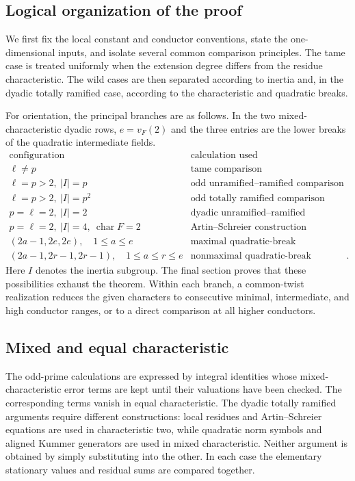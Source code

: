 \documentclass[11pt]{amsart}
\theoremstyle{definition}
\theoremstyle{remark}
\begin{document}
\subsection*{Logical organization of the proof}
We first fix the local constant and conductor conventions, state the
one-dimensional inputs, and isolate several common comparison
principles. The tame case is treated uniformly when the extension
degree differs from the residue characteristic. The wild cases are
then separated according to inertia and, in the dyadic totally ramified
case, according to the characteristic and quadratic breaks.

For orientation, the principal branches are as follows. In the two
mixed-characteristic dyadic rows, $e=v_F(2)$ and the three entries are
the lower breaks of the quadratic intermediate fields.
\[
\begin{array}{c|l}
\text{configuration} & \text{calculation used}\\ \hline
\ell\ne p & \text{tame comparison}\\
\ell=p>2,\ |I|=p & \text{odd unramified--ramified comparison}\\
\ell=p>2,\ |I|=p^2 & \text{odd totally ramified comparison}\\
p=\ell=2,\ |I|=2 & \text{dyadic unramified--ramified comparison}\\
p=\ell=2,\ |I|=4,\ \operatorname{char}F=2
 & \text{Artin--Schreier construction}\\
(2a-1,2e,2e),\quad 1\le a\le e
 & \text{maximal quadratic-break construction}\\
(2a-1,2r-1,2r-1),\quad 1\le a\le r\le e
 & \text{nonmaximal quadratic-break construction}.
\end{array}
\]
Here $I$ denotes the inertia subgroup. The final section proves that
these possibilities exhaust the theorem. Within each branch, a
common-twist realization reduces the given characters to consecutive
minimal, intermediate, and high conductor ranges, or to a direct
comparison at all higher conductors.

\subsection*{Mixed and equal characteristic}
The odd-prime calculations are expressed by integral identities whose
mixed-characteristic error terms are kept until their valuations have
been checked. The corresponding terms vanish in equal characteristic.
The dyadic totally ramified arguments require different constructions:
local residues and Artin--Schreier equations are used in characteristic
two, while quadratic norm symbols and aligned Kummer generators are
used in mixed characteristic. Neither argument is obtained by simply
substituting into the other. In each case the elementary stationary
values and residual sums are compared together.
\end{document}
